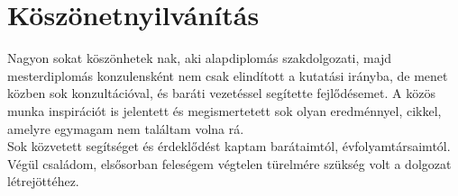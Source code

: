 \chapter*{Köszönetnyilvánítás}

Nagyon sokat köszönhetek \vikkonzulens nak, aki alapdiplomás szakdolgozati, majd mesterdiplomás konzulensként nem csak elindított a kutatási irányba, de menet közben sok konzultációval, és baráti vezetéssel segítette fejlődésemet. A közös munka inspirációt is jelentett és megismertetett sok olyan eredménnyel, cikkel, amelyre egymagam nem találtam volna rá.\\

Sok közvetett segítséget és érdeklődést kaptam barátaimtól, évfolyamtársaimtól. Végül családom, elsősorban feleségem végtelen türelmére szükség volt a dolgozat létrejöttéhez.
